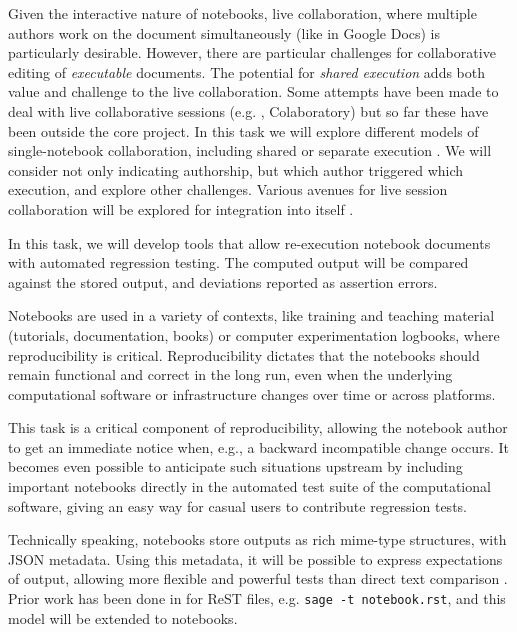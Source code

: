 \begin{workpackage}
\begin{tasklist}
\begin{task}[id=notebook-collab,title=Notebook improvements for collaboration,lead=SR, partners={PS,USH,JU,USO,LL}, PM=20, wphases=0-24]
  Given the interactive nature of \Jupyter notebooks, live
  collaboration, where multiple authors work on the document
  simultaneously (like in Google Docs) is particularly
  desirable. However, there are particular challenges for
  collaborative editing of \emph{executable} documents. The potential
  for \emph{shared execution} adds both value and challenge to the
  live collaboration. Some attempts have been made to deal with live
  collaborative sessions (e.g. \SMC, Colaboratory) but so far these
  have been outside the core \Jupyter project. In this task we will
  explore different models of single-notebook collaboration, including
  shared or separate execution . We will
  consider not only indicating authorship, but which author
  triggered which execution, and explore other challenges.  Various
  avenues for live session collaboration will be explored for
  integration into \Jupyter itself
  .
\end{task}

\begin{task}[id=notebook-verification,title=Reproducible Notebooks,lead=SR, partners={PS,USO}, PM=4, wphases=12-24]
  In this task, we will develop tools that allow re-execution
  notebook documents with automated regression testing. The computed
  output will be compared against the stored output, and deviations
  reported as assertion errors.

  Notebooks are used in a variety of contexts, like training and
  teaching material (tutorials, documentation, books) or computer
  experimentation logbooks, where reproducibility is
  critical. Reproducibility dictates that the notebooks should remain
  functional and correct in the long run, even when the underlying
  computational software or infrastructure changes over time or across
  platforms.

  This task is a critical component of reproducibility, allowing the
  notebook author to get an immediate notice when, e.g., a backward
  incompatible change occurs. It becomes even possible to anticipate
  such situations upstream by including important notebooks directly
  in the automated test suite of the computational software, giving an
  easy way for casual users to contribute regression tests.

  Technically speaking, \Jupyter notebooks store outputs as rich
  mime-type structures, with JSON metadata. Using this metadata, it
  will be possible to express expectations of output, allowing more
  flexible and powerful tests than direct text comparison
  .  Prior work has been done in \Sage for
  ReST files, e.g. \lstinline{sage -t notebook.rst}, and this model
  will be extended to notebooks.
\end{task}


\end{tasklist}
\end{workpackage}
